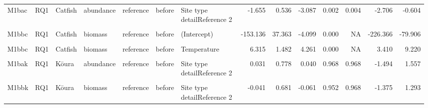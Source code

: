 \documentclass[
  12pt,
  a4paper,
  oneside]{scrbook}
\begin{document}
\begin{landscape}
\begin{longtable}[t]{lllllllrrrrrrr}
M1bac & RQ1 & Catfish & abundance & reference & before & Site type detailReference 2 & -1.655 & 0.536 & -3.087 & 0.002 & 0.004 & -2.706 & -0.604\\
\addlinespace
\cellcolor{gray!8}{M1bac} & \cellcolor{gray!8}{RQ1} & \cellcolor{gray!8}{Catfish} & \cellcolor{gray!8}{abundance} & \cellcolor{gray!8}{reference} & \cellcolor{gray!8}{before} & \cellcolor{gray!8}{Temperature} & \cellcolor{gray!8}{4.079} & \cellcolor{gray!8}{1.293} & \cellcolor{gray!8}{3.154} & \cellcolor{gray!8}{0.002} & \cellcolor{gray!8}{NA} & \cellcolor{gray!8}{1.544} & \cellcolor{gray!8}{6.613}\\
M1bbc & RQ1 & Catfish & biomass & reference & before & (Intercept) & -153.136 & 37.363 & -4.099 & 0.000 & NA & -226.366 & -79.906\\
\cellcolor{gray!8}{M1bbc} & \cellcolor{gray!8}{RQ1} & \cellcolor{gray!8}{Catfish} & \cellcolor{gray!8}{biomass} & \cellcolor{gray!8}{reference} & \cellcolor{gray!8}{before} & \cellcolor{gray!8}{Site type detailReference 2} & \cellcolor{gray!8}{-2.569} & \cellcolor{gray!8}{0.743} & \cellcolor{gray!8}{-3.457} & \cellcolor{gray!8}{0.001} & \cellcolor{gray!8}{0.002} & \cellcolor{gray!8}{-4.026} & \cellcolor{gray!8}{-1.112}\\
M1bbc & RQ1 & Catfish & biomass & reference & before & Temperature & 6.315 & 1.482 & 4.261 & 0.000 & NA & 3.410 & 9.220\\
\cellcolor{gray!8}{M1bak} & \cellcolor{gray!8}{RQ1} & \cellcolor{gray!8}{Kōura} & \cellcolor{gray!8}{abundance} & \cellcolor{gray!8}{reference} & \cellcolor{gray!8}{before} & \cellcolor{gray!8}{(Intercept)} & \cellcolor{gray!8}{0.742} & \cellcolor{gray!8}{0.553} & \cellcolor{gray!8}{1.343} & \cellcolor{gray!8}{0.179} & \cellcolor{gray!8}{NA} & \cellcolor{gray!8}{-0.341} & \cellcolor{gray!8}{1.825}\\
\addlinespace
M1bak & RQ1 & Kōura & abundance & reference & before & Site type detailReference 2 & 0.031 & 0.778 & 0.040 & 0.968 & 0.968 & -1.494 & 1.557\\
\cellcolor{gray!8}{M1bbk} & \cellcolor{gray!8}{RQ1} & \cellcolor{gray!8}{Kōura} & \cellcolor{gray!8}{biomass} & \cellcolor{gray!8}{reference} & \cellcolor{gray!8}{before} & \cellcolor{gray!8}{(Intercept)} & \cellcolor{gray!8}{3.623} & \cellcolor{gray!8}{0.478} & \cellcolor{gray!8}{7.580} & \cellcolor{gray!8}{0.000} & \cellcolor{gray!8}{NA} & \cellcolor{gray!8}{2.686} & \cellcolor{gray!8}{4.560}\\
M1bbk & RQ1 & Kōura & biomass & reference & before & Site type detailReference 2 & -0.041 & 0.681 & -0.061 & 0.952 & 0.968 & -1.375 & 1.293\\

\end{longtable}
\end{landscape}
\end{document}
